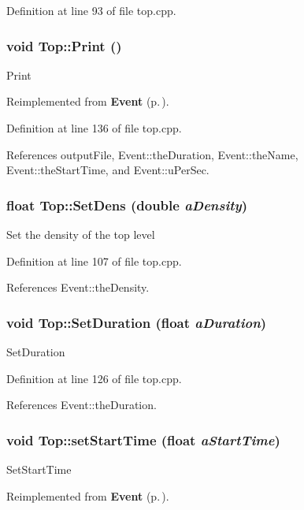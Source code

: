 Definition at line 93 of file top.cpp.
\subsubsection{\setlength{\rightskip}{0pt plus 5cm}void Top::Print ()\hspace{0.3cm}{\tt  [virtual]}}\label{classTop_a8}


Print 

Reimplemented from {\bf Event} {\rm (p.\,\pageref{classEvent_a57})}.

Definition at line 136 of file top.cpp.

References output\-File, Event::the\-Duration, Event::the\-Name, Event::the\-Start\-Time, and Event::u\-Per\-Sec.
\subsubsection{\setlength{\rightskip}{0pt plus 5cm}float Top::Set\-Dens (double {\em a\-Density})}\label{classTop_a7}


Set the density of the top level 

Definition at line 107 of file top.cpp.

References Event::the\-Density.
\subsubsection{\setlength{\rightskip}{0pt plus 5cm}void Top::Set\-Duration (float {\em a\-Duration})\hspace{0.3cm}{\tt  [virtual]}}\label{classTop_a6}


Set\-Duration 

Definition at line 126 of file top.cpp.

References Event::the\-Duration.
\subsubsection{\setlength{\rightskip}{0pt plus 5cm}void Top::set\-Start\-Time (float {\em a\-Start\-Time})\hspace{0.3cm}{\tt  [virtual]}}\label{classTop_a5}


Set\-Start\-Time 

Reimplemented from {\bf Event} {\rm (p.\,\pageref{classEvent_a7})}.

